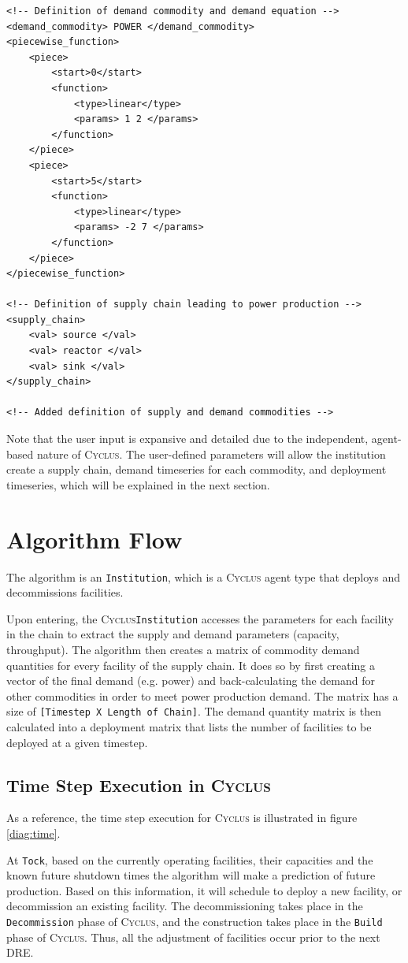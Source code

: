 \documentclass[11pt,letterpaper]{article}
\newcommand{\Cyclus}{\textsc{Cyclus}\xspace}%
\begin{document}
\begin{verbatim}
<!-- Definition of demand commodity and demand equation -->
<demand_commodity> POWER </demand_commodity>
<piecewise_function>
	<piece>
		<start>0</start>
		<function>
			<type>linear</type>
			<params> 1 2 </params>
		</function>
	</piece>
	<piece>
		<start>5</start>
		<function>
			<type>linear</type>
			<params> -2 7 </params>
		</function>
	</piece>
</piecewise_function>

<!-- Definition of supply chain leading to power production -->
<supply_chain>
	<val> source </val>
	<val> reactor </val>
	<val> sink </val>
</supply_chain>

<!-- Added definition of supply and demand commodities -->
\end{verbatim}

Note that the user input is expansive and detailed due to the 
independent, agent-based nature of \Cyclus. The user-defined
parameters will allow the institution create a supply chain,
demand timeseries for each commodity, and deployment timeseries,
which will be explained in the next section.

\section{Algorithm Flow}

The algorithm is an \texttt{Institution}, which is a \Cyclus agent type
that deploys and decommissions facilities.

Upon entering, the \Cyclus \texttt{Institution} accesses the parameters for each
facility in the chain to extract the supply and demand parameters (capacity, throughput).
The algorithm then creates a matrix of commodity demand quantities for every
facility of the supply chain. It does so by first creating a vector
of the final demand (e.g. power) and back-calculating the demand for other
commodities in order to meet power production demand.
The matrix has a size of \texttt{[Timestep X Length of Chain]}.
The demand quantity matrix is then calculated into a deployment matrix that
lists the number of facilities to be deployed at a given timestep.

\subsection{Time Step Execution in \Cyclus}
As a reference, the time step execution for \Cyclus is illustrated in figure \ref{diag:time}.

At \texttt{Tock}, based on the currently operating facilities, their capacities and the known future shutdown times the algorithm will make a prediction of future production. Based on this information, 
it will schedule to deploy a new facility, or decommission an existing facility. The decommissioning
takes place in the \texttt{Decommission} phase of \Cyclus, and the construction takes place in the 
\texttt{Build} phase of \Cyclus. Thus, all the adjustment of facilities occur prior to the next \gls{DRE}.
\end{document}
